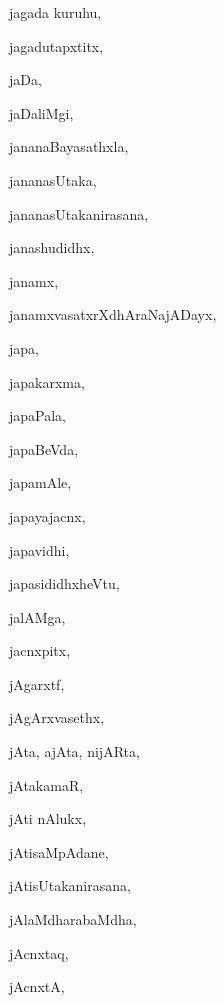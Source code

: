 \begin{multicols}{3}
{\noindent
{jagada kuruhu}, \pageref{jagada kuruhu}

\noindent
{jagadutapxtitx}, \pageref{jagadutapxtitx}

\noindent
{jaDa}, \pageref{jaDa}

\noindent
{jaDaliMgi}, \pageref{jaDaliMgi}

\noindent
{jananaBayasathxla}, \pageref{jananaBayasathxla}

\noindent
{jananasUtaka}, \pageref{jananasUtaka}

\noindent
{jananasUtakanirasana}, \pageref{jananasUtakanirasana}

\noindent
{janashudidhx}, \pageref{janashudidhx}

\noindent
{janamx}, \pageref{janamx}

\noindent
{janamxvasatxrXdhAraNajADayx}, \pageref{janamxvasatxrXdhAraNajADayx}

\noindent
{japa}, \pageref{japa}

\noindent
{japakarxma}, \pageref{japakarxma}

\noindent
{japaPala}, \pageref{japaPala}

\noindent
{japaBeVda}, \pageref{japaBeVda}

\noindent
{japamAle}, \pageref{japamAle}

\noindent
{japayajacnx}, \pageref{japayajacnx}

\noindent
{japavidhi}, \pageref{japavidhi}

\noindent
{japasididhxheVtu}, \pageref{japasididhxheVtu}

\noindent
{jalAMga}, \pageref{jalAMga}

\noindent
{jacnxpitx}, \pageref{jacnxpitx}

\noindent
{jAgarxtf}, \pageref{jAgarxtf}

\noindent
{jAgArxvasethx}, \pageref{jAgArxvasethx}

\noindent
{jAta, ajAta, nijARta}, \pageref{jAta, ajAta, nijARta}

\noindent
{jAtakamaR}, \pageref{jAtakamaR}

\noindent
{jAti nAlukx}, \pageref{jAti nAlukx}

\noindent
{jAtisaMpAdane}, \pageref{jAtisaMpAdane}

\noindent
{jAtisUtakanirasana}, \pageref{jAtisUtakanirasana}

\noindent
{jAlaMdharabaMdha}, \pageref{jAlaMdharabaMdha}

\noindent
{jAcnxtaq}, \pageref{jAcnxtaq}

\noindent
{jAcnxtA}, \pageref{jAcnxtA}

}
\end{multicols}
